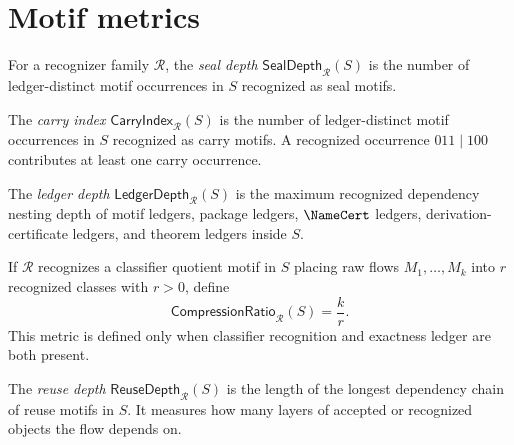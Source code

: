 \section{Motif metrics}
\label{sec:motif-generated-metrics}

\begin{definition}
\label{def:motif-generated-seal-depth}
For a recognizer family $\mathcal R$, the \emph{seal depth} $\mathsf{SealDepth}_{\mathcal R}(S)$ is the number of ledger-distinct motif occurrences in $S$ recognized as seal motifs.
\end{definition}

\begin{definition}
\label{def:motif-generated-carry-index}
The \emph{carry index} $\mathsf{CarryIndex}_{\mathcal R}(S)$ is the number of ledger-distinct motif occurrences in $S$ recognized as carry motifs. A recognized occurrence $011\mid 100$ contributes at least one carry occurrence.
\end{definition}

\begin{definition}
\label{def:motif-generated-ledger-depth}
The \emph{ledger depth} $\mathsf{LedgerDepth}_{\mathcal R}(S)$ is the maximum recognized dependency nesting depth of motif ledgers, package ledgers, $\NameCert$ ledgers, derivation-certificate ledgers, and theorem ledgers inside $S$.
\end{definition}

\begin{definition}
\label{def:motif-generated-compression-ratio}
If $\mathcal R$ recognizes a classifier quotient motif in $S$ placing raw flows $M_1,\ldots,M_k$ into $r$ recognized classes with $r>0$, define
$$
  \mathsf{CompressionRatio}_{\mathcal R}(S)=\frac{k}{r}.
$$
This metric is defined only when classifier recognition and exactness ledger are both present.
\end{definition}

\begin{definition}
\label{def:motif-generated-reuse-depth}
The \emph{reuse depth} $\mathsf{ReuseDepth}_{\mathcal R}(S)$ is the length of the longest dependency chain of reuse motifs in $S$. It measures how many layers of accepted or recognized objects the flow depends on.
\end{definition}

